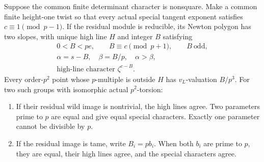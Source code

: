 \begin{lemma}
\label{lem:B-RD68-rules}
Suppose the common finite determinant character is nonsquare.
Make a common finite height-one twist so that every actual
special tangent exponent satisfies \(c\equiv1\pmod{p-1}\).
If the residual module is reducible, its Newton polygon has two
slopes, with unique high line \(H\) and integer \(B\) satisfying
\[
 \begin{gathered}
 0<B<pe,\qquad B\equiv c\pmod{p+1},\qquad B\ \text{odd},\\
 \alpha=s-B,\quad\beta=B/p,\quad\alpha>\beta,\\
 \text{high-line character } \zeta^{c-B}.
 \end{gathered}
 \tag{B-RD68.2}
\]
Every order-\(p^2\) point whose \(p\)-multiple is outside \(H\)
has \(v_L\)-valuation \(B/p^3\).
For two such groups with isomorphic actual \(p^2\)-torsion:

\begin{enumerate}
\item If their residual wild image is nontrivial, the high lines
agree. Two parameters prime to \(p\) are equal and give equal
special characters. Exactly one parameter cannot be divisible
by \(p\).
\item If the residual image is tame, write \(B_i=pb_i\).
When both \(b_i\) are prime to \(p\), they are equal, their
high lines agree, and the special characters agree.
\end{enumerate}
\end{lemma}
